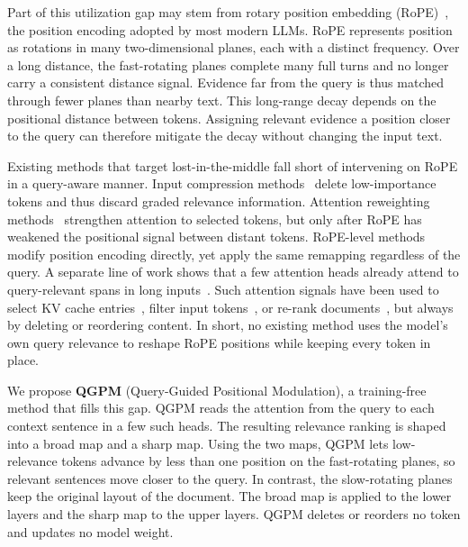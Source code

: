 \documentclass[11pt]{article}
\begin{document}
Part of this utilization gap may stem from rotary position embedding (RoPE)~\citep{su2024roformer}, the position encoding adopted by most modern LLMs. RoPE represents position as rotations in many two-dimensional planes, each with a distinct frequency. Over a long distance, the fast-rotating planes complete many full turns and no longer carry a consistent distance signal. Evidence far from the query is thus matched through fewer planes than nearby text. This long-range decay depends on the positional distance between tokens. Assigning relevant evidence a position closer to the query can therefore mitigate the decay without changing the input text.

Existing methods that target lost-in-the-middle fall short of intervening on RoPE in a query-aware manner. Input compression methods~\citep{jiang2024longllmlingua,pan2024llmlingua2,li2023compressing} delete low-importance tokens and thus discard graded relevance information. Attention reweighting methods~\citep{zhang2024tell,zhang2024model,guardieiro2025instruction} strengthen attention to selected tokens, but only after RoPE has weakened the positional signal between distant tokens. RoPE-level methods~\citep{zhang2024found,jin2024llm,an2025why} modify position encoding directly, yet apply the same remapping regardless of the query. A separate line of work shows that a few attention heads already attend to query-relevant spans in long inputs~\citep{wu2025retrieval,zhang2025query}. Such attention signals have been used to select KV cache entries~\citep{li2024snapkv}, filter input tokens~\citep{shi2026discovering}, or re-rank documents~\citep{zhang2025query}, but always by deleting or reordering content. In short, no existing method uses the model's own query relevance to reshape RoPE positions while keeping every token in place.

We propose \textbf{QGPM} (Query-Guided Positional Modulation), a training-free method that fills this gap. QGPM reads the attention from the query to each context sentence in a few such heads. The resulting relevance ranking is shaped into a broad map and a sharp map. Using the two maps, QGPM lets low-relevance tokens advance by less than one position on the fast-rotating planes, so relevant sentences move closer to the query. In contrast, the slow-rotating planes keep the original layout of the document. The broad map is applied to the lower layers and the sharp map to the upper layers. QGPM deletes or reorders no token and updates no model weight.
\end{document}
